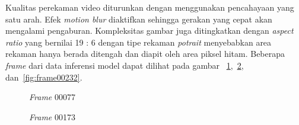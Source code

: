 Kualitas perekaman video diturunkan dengan menggunakan pencahayaan yang satu arah.
Efek \textit{motion blur} diaktifkan sehingga gerakan yang cepat akan mengalami pengaburan.
Kompleksitas gambar juga ditingkatkan dengan
\textit{aspect ratio} yang bernilai 19 : 6 dengan tipe rekaman \textit{potrait} menyebabkan area rekaman
hanya berada ditengah dan diapit oleh area piksel hitam.
Beberapa \textit{frame} dari data inferensi model dapat dilihat pada gambar
~\ref{fig:frame00077},~\ref{fig:frame00173}, dan~\ref{fig:frame00232}.

\begin{figure}[htbp]
    \begin{center}
    \end{center}
    \vspace{-20pt}
    \captionsetup{labelfont=bf, textfont=bf}
    \caption{\textit{Frame} 00077}
    \vspace{-10pt}
    \captionsetup{labelfont=md, textfont=md}
    \label{fig:frame00077}
\end{figure}

\begin{figure}[htbp]
    \begin{center}
    \end{center}
    \vspace{-20pt}
    \captionsetup{labelfont=bf, textfont=bf}
    \caption{\textit{Frame} 00173}
    \vspace{-10pt}
    \captionsetup{labelfont=md, textfont=md}
    \label{fig:frame00173}
\end{figure}

